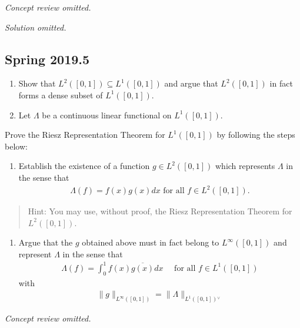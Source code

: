 \emph{Concept review omitted.}

\emph{Solution omitted.}

\hypertarget{spring-2019.5}{%
\subsection{Spring 2019.5}\label{spring-2019.5}}

\begin{enumerate}
\def\labelenumi{\alph{enumi}.}
\item
  Show that \(L^2([0, 1]) ⊆ L^1([0, 1])\) and argue that \(L^2([0, 1])\)
  in fact forms a dense subset of \(L^1([0, 1])\).
\item
  Let \(Λ\) be a continuous linear functional on \(L^1([0, 1])\).
\end{enumerate}

Prove the Riesz Representation Theorem for \(L^1([0, 1])\) by following
the steps below:

\begin{enumerate}
\def\labelenumi{\roman{enumi}.}
\tightlist
\item
  Establish the existence of a function \(g ∈ L^2([0, 1])\) which
  represents \(Λ\) in the sense that
  \begin{align*}
    Λ(f ) = f (x)g(x) dx \text{ for all } f ∈ L^2([0, 1]).
    \end{align*}
\end{enumerate}

\begin{quote}
Hint: You may use, without proof, the Riesz Representation Theorem for
\(L^2([0, 1])\).
\end{quote}

\begin{enumerate}
\def\labelenumi{\roman{enumi}.}
\setcounter{enumi}{1}
\tightlist
\item
  Argue that the \(g\) obtained above must in fact belong to
  \(L^∞([0, 1])\) and represent \(Λ\) in the sense that
  \begin{align*}
    \Lambda(f)=\int_{0}^{1} f(x) \overline{g(x)} d x \quad \text { for all } f \in L^{1}([0,1])
    \end{align*}
  with
  \begin{align*}
    \|g\|_{L^{\infty}([0,1])} = \|\Lambda\|_{L^{1}([0,1]) {}^{ \vee }}
    \end{align*}
\end{enumerate}

\emph{Concept review omitted.}

